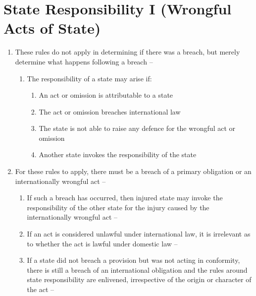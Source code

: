 \section{State Responsibility I (Wrongful Acts of State)}
\begin{enumerate}
    \item These rules do not apply in determining if there was a breach, but merely determine what happens following a breach -- 
    \begin{enumerate}
        \item The responsibility of a state may arise if:
        \begin{enumerate}
            \item An act or omission is attributable to a state
            \item The act or omission breaches international law
            \item The state is not able to raise any defence for the wrongful act or omission
            \item Another state invokes the responsibility of the state
        \end{enumerate}
    \end{enumerate}
    \item For these rules to apply, there must be a breach of a primary obligation or an internationally wrongful act -- 
    \begin{enumerate}
        \item If such a breach has occurred, then injured state may invoke the responsibility of the other state for the injury caused by the internationally wrongful act -- 
        \item If an act is considered unlawful under international law, it is irrelevant as to whether the act is lawful under domestic law -- 
        \item If a state did not breach a provision but was not acting in conformity, there is still a breach of an international obligation and the rules around state responsibility are enlivened, irrespective of the origin or character of the act -- 

\end{enumerate}
\end{enumerate}
